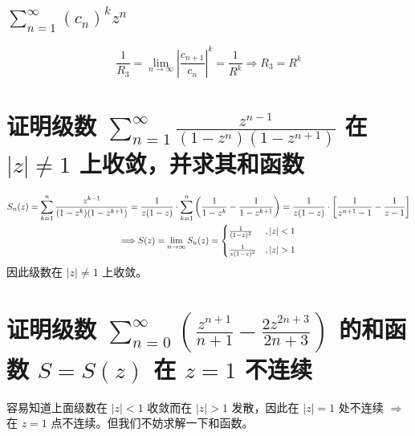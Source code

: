 \documentclass[UTF8]{report}
\theoremstyle{MyLineTheoremStyle} %
\theoremstyle{MyBlockTheoremStyle} %
\theoremstyle{MySubsubsectionStyle} %
\begin{document}
\subsection{$\sum_{n=1}^{\infty} (c_n)^k z^n$}
\noindent
\begin{equation}
\frac{1}{R_3}
= \lim_{n \to \infty} \left| \frac{c_{n+1}}{c_n} \right|^k
= \frac{1}{R^k} \Longrightarrow R_3 = R^k
\end{equation}

\section{证明级数 $\sum_{n=1}^{\infty} \frac{z^{n-1}}{(1 - z^n)(1 - z^{n+1})}$ 在 $ | z | \ne 1$ 上收敛，并求其和函数}
\begin{gather*}
    S_n(z) 
    = \sum_{k=1}^{n} \frac{z^{k-1}}{(1 - z^k)(1 - z^{k+1})} 
    = \frac{1}{z(1 - z)} \cdot \sum_{k=1}^{n} \left( \frac{1}{1 - z^k} - \frac{1}{1 - z^{k+1}} \right) 
    = \frac{1}{z(1 - z)} \cdot \left[ \frac{1}{z^{n+1} - 1} - \frac{1}{z - 1} \right]
    \\ 
    \Longrightarrow 
    S(z) = \lim_{n \to \infty}S_n(z) = 
    \begin{cases}
        \frac{1}{(1 - z)^2} &, | z | < 1 \vspace*{2mm} \\ 
        \frac{1}{z(1 - z)^2} &, | z | > 1
    \end{cases}
\end{gather*}
因此级数在 $ | z | \ne 1$ 上收敛。


\section{证明级数 $\sum_{n=0}^{\infty} \left( \frac{z^{n+1}}{n+1} - \frac{2z^{2n+3}}{2n+3} \right)$ 的和函数 $S = S(z)$ 在 $z = 1$ 不连续}
容易知道上面级数在 $| z | < 1$ 收敛而在 $| z | > 1$ 发散，因此在 $| z | = 1$ 处不连续 $\Longrightarrow $ 在 $z = 1$ 点不连续。但我们不妨求解一下和函数。
\end{document}
